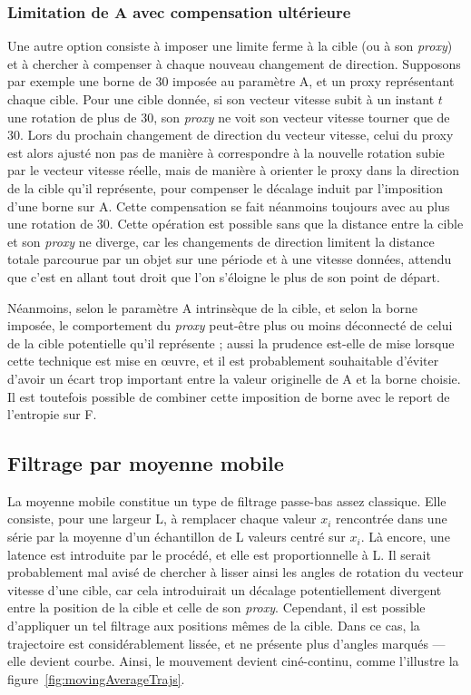 	\subsubsection{Limitation de A avec compensation ultérieure}
	Une autre option consiste à imposer une limite ferme à la cible (ou à son \emph{proxy}) et à chercher à compenser à chaque nouveau changement de direction. Supposons par exemple une borne de 30\textdegree{} imposée au paramètre A, et un proxy représentant chaque cible. Pour une cible donnée, si son vecteur vitesse subit à un instant $t$ une rotation de plus de 30\textdegree{}, son \emph{proxy} ne voit son vecteur vitesse tourner que de 30\textdegree{}. Lors du prochain changement de direction du vecteur vitesse, celui du proxy est alors ajusté non pas de manière à correspondre à la nouvelle rotation subie par le vecteur vitesse réelle, mais de manière à orienter le proxy dans la direction de la cible qu'il représente, pour compenser le décalage induit par l'imposition d'une borne sur A. Cette compensation se fait néanmoins toujours avec au plus une rotation de 30\textdegree{}. Cette opération est possible sans que la distance entre la cible et son \emph{proxy} ne diverge, car les changements de direction limitent la distance totale parcourue par un objet sur une période et à une vitesse données, attendu que c'est en allant tout droit que l'on s'éloigne le plus de son point de départ.
	
	Néanmoins, selon le paramètre A intrinsèque de la cible, et selon la borne imposée, le comportement du \emph{proxy} peut-être plus ou moins déconnecté de celui de la cible potentielle qu'il représente ; aussi la prudence est-elle de mise lorsque cette technique est mise en œuvre, et il est probablement souhaitable d'éviter d'avoir un écart trop important entre la valeur originelle de A et la borne choisie. Il est toutefois possible de combiner cette imposition de borne avec le report de l'entropie sur F.
	
	\subsection{Filtrage par moyenne mobile}
	La moyenne mobile constitue un type de filtrage passe-bas assez classique. Elle consiste, pour une largeur L, à remplacer chaque valeur $x_{i}$ rencontrée dans une série par la moyenne d'un échantillon de L valeurs centré sur $x_{i}$. Là encore, une latence est introduite par le procédé, et elle est proportionnelle à L. Il serait probablement mal avisé de chercher à lisser ainsi les angles de rotation du vecteur vitesse d'une cible, car cela introduirait un décalage potentiellement divergent entre la position de la cible et celle de son \emph{proxy}. Cependant, il est possible d'appliquer un tel filtrage aux positions mêmes de la cible. Dans ce cas, la trajectoire est considérablement lissée, et ne présente plus d'angles marqués --- elle devient courbe. Ainsi, le mouvement devient ciné-continu, comme l'illustre la figure~\ref{fig:movingAverageTrajs}.
	

